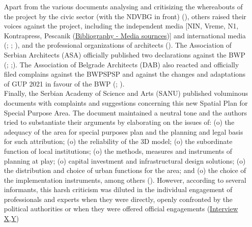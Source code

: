 \documentclass[11pt]{report}
\begin{document}
Apart from the various documents analysing and critisizing the whereabouts of the project by the civic sector (with the NDVBG in front) (\href{NBG}{\citealt{inicijativa_ne_davimo_beograd_analiza_2016}}), others raised their voices against the project, including the independent media [NIN, Vreme, N1, Kontrapress, Pescanik (\href{Bibliography - Media sournces}{Bibliography - Media sournces})] and international media (\href{Wright}{\citealt{wright_belgrade_2015}}; \href{Eror}{\citealt{eror_belgrades_2015}}; \href{BBC}{\citealt{ahmed_controversy_2016}}), and the professional organizations of architects (\cite{ref}).
The Association of Serbian Architects (ASA) officially published two declarations against the BWP (\href{Deklaracija1}{\citealt{akademija_arhitekture_srbije_deklaracija_2016}}; \href{Deklaracija2}{\citealt{akademija_arhitekture_srbije_deklaracija_2016-1}};\href{Deklaracija3}{\citealt{akademija_arhitekture_srbije_deklaracija_2015}}). 
The Association of Belgrade Architects (DAB) also reacted and officially filed complains against the BWPSPSP and against the changes and adaptations of GUP 2021 in favour of the BWP (\href{UAS}{\citealt{udruzenje_arhitekata_srbije_odgovor_2014}}; \href{Primedbe}{\citealt{drustvo_arhitekata_srbije_primedbe_2014}}).
\\

Finally, the Serbian Academy of Science and Arts (SANU) published voluminous documents with complaints and suggestions concerning this new Spatial Plan for Special Purpose Area. The document maintained a neutral tone and the authors tried to substantiate their arguments by elaborating on the issues of: (o) the adequacy of the area for special purposes plan and the planning and legal basis for such attribution; (o) the reliability of the 3D model; (o) the subordinate function of local institutions; (o) the methods, measures and instruments of planning at play; (o) capital investment and infrastructural design solutions; (o) the distribution and choice of urban functions for the area; and (o) the choice of the implementation instruments, among others (\href{ref}{\citealt{sanu_nacrt_2014}}).
However, according to several informants, this harsh criticism was diluted in the individual engagement of professionals and experts when they were directly, openly confronted by the political authorities or when they were offered official engagements
(\href{InterviewX}{Interview X,Y})
\\
\end{document}
